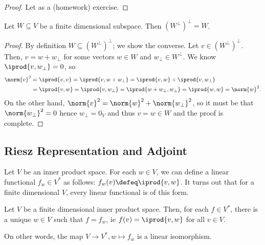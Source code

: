 \begin{proof}
    Let as a (homework) exercise.
\end{proof}

\begin{corollary}
    Let $W \subseteq V$ be a finite dimensional subspace. Then $(W^\perp)^\perp = W$.
\end{corollary}

\begin{proof}
    By definition $W \subseteq (W^\perp)^\perp$; we show the converse. Let $v \in (W^\perp)^\perp$. Then, $v= w + w_\perp$ for some vectors $w \in W$ and $w_\perp \in W^\perp$. We know $\iprod{v, w_\perp} = 0$, so \begin{align*}
    \norm{v}^2 &= \iprod{v, v}     = \iprod{v, w + w_\perp} = \iprod{v, w} + \iprod{v, w_\perp} \\
    &= \iprod{v, w} = \iprod{v, w_\perp} = \iprod{w + w_\perp, w_\perp} = \iprod{w, w} = \norm{w}^2.
    \end{align*}
    On the other hand, $\norm{v}^2 = \norm{w}^2 + \norm{w_\perp}^2$, so it must be that $\norm{w_\perp}^2 = 0$ hence $w_\perp = 0_V$ and thus $v = w \in W$ and the proof is complete.
\end{proof}

\subsection{Riesz Representation and Adjoint}

Let $V$ be an inner product space. For each $w \in V$, we can define a linear functional $f_w \in V^\ast$ as follows: $f_w(v) \defeq \iprod{v, w}$. It turns out that for a finite dimensional $V$, every linear functional is of this form.

\begin{theorem}\label{thm:riesz}
    Let $V$ be a finite dimensional inner product space. Then, for each $f \in V^\ast$, there is a unique $w \in V$ such that $f = f_w$, ie $f(v) = \iprod{v, w}$ for all $v \in V$. 

    On other words, the map $V \to V^\ast, w \mapsto f_w$ is a linear isomorphism.
\end{theorem}

